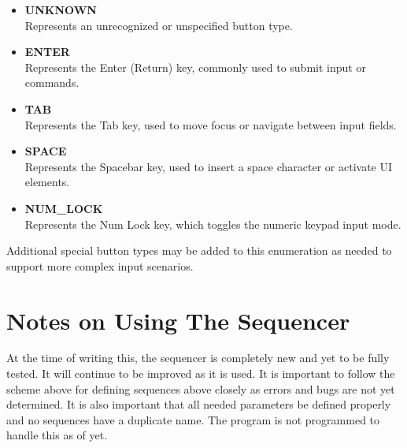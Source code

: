 \begin{itemize}
	\item \textbf{UNKNOWN} \hfill \\
	Represents an unrecognized or unspecified button type.
	
	\item \textbf{ENTER} \hfill \\
	Represents the Enter (Return) key, commonly used to submit input or commands.
	
	\item \textbf{TAB} \hfill \\
	Represents the Tab key, used to move focus or navigate between input fields.
	
	\item \textbf{SPACE} \hfill \\
	Represents the Spacebar key, used to insert a space character or activate UI elements.
	
	\item \textbf{NUM\_LOCK} \hfill \\
	Represents the Num Lock key, which toggles the numeric keypad input mode.
\end{itemize}

\noindent Additional special button types may be added to this enumeration as needed to support more complex input scenarios.




\section{Notes on Using The Sequencer}

At the time of writing this, the sequencer is completely new and yet to be fully tested. It will continue to be improved as it is used. It is important to follow the scheme above for defining sequences above closely as errors and bugs are not yet determined. It is also important that all needed parameters be defined properly and no sequences have a duplicate name. The program is not programmed to handle this as of yet.
